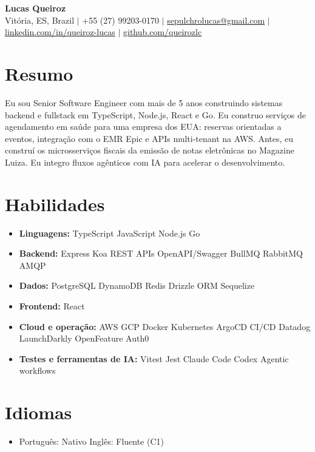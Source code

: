 \documentclass[letterpaper,10pt]{article}
\newcommand{\resumeItem}[1]{\item\small{#1}}
\newcommand{\resumeSubHeadingList}{\begin{itemize}[leftmargin=0.15in, label={}, nosep, beginpenalty=10000]}
\newcommand{\resumeSubHeadingListEnd}{\end{itemize}}
\begin{document}
\begin{center}
  \textbf{\Huge Lucas Queiroz} \\[3pt]
  \small Vit\'oria, ES, Brazil $|$ +55 (27) 99203-0170 $|$ \href{mailto:sepulchrolucas@gmail.com}{sepulchrolucas@gmail.com} $|$
  \href{https://linkedin.com/in/queiroz-lucas}{linkedin.com/in/queiroz-lucas} $|$
  \href{https://github.com/queirozlc}{github.com/queirozlc}
\end{center}
\vspace{2pt}

\section{Resumo}
Eu sou Senior Software Engineer com mais de 5 anos construindo sistemas backend e fullstack em TypeScript, Node.js, React e Go. Eu construo servi\c{c}os de agendamento em sa\'ude para uma empresa dos EUA: reservas orientadas a eventos, integra\c{c}\~ao com o EMR Epic e APIs multi-tenant na AWS. Antes, eu constru\'i os microsservi\c{c}os fiscais da emiss\~ao de notas eletr\^onicas no Magazine Luiza. Eu integro fluxos ag\^enticos com IA para acelerar o desenvolvimento.

\section{Habilidades}
\resumeSubHeadingList
\resumeItem{\textbf{Linguagens:} TypeScript \textbar{} JavaScript \textbar{} Node.js \textbar{} Go}
\resumeItem{\textbf{Backend:} Express \textbar{} Koa \textbar{} REST APIs \textbar{} OpenAPI/Swagger \textbar{} BullMQ \textbar{} RabbitMQ \textbar{} AMQP}
\resumeItem{\textbf{Dados:} PostgreSQL \textbar{} DynamoDB \textbar{} Redis \textbar{} Drizzle ORM \textbar{} Sequelize}
\resumeItem{\textbf{Frontend:} React}
\resumeItem{\textbf{Cloud e opera\c{c}\~ao:} AWS \textbar{} GCP \textbar{} Docker \textbar{} Kubernetes \textbar{} ArgoCD \textbar{} CI/CD \textbar{} Datadog \textbar{} LaunchDarkly \textbar{} OpenFeature \textbar{} Auth0}
\resumeItem{\textbf{Testes e ferramentas de IA:} Vitest \textbar{} Jest \textbar{} Claude Code \textbar{} Codex \textbar{} Agentic workflows}\resumeSubHeadingListEnd

\section{Idiomas}
\resumeSubHeadingList
\resumeItem{Portugu\^es: Nativo \textbar{} Ingl\^es: Fluente (C1)}
\resumeSubHeadingListEnd
\end{document}
